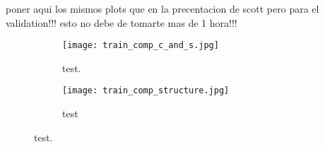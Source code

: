 
\glsresetall
\graphicspath{{./Sections/Results/Resources/}}

poner aqui los mismos plots que en la precentacion de scott pero para el validation!!! esto no debe de tomarte mas de 1 hora!!!

\begin{figure}[!ht]
  \centering
  \begin{subfigure}[b]{.9\linewidth}
    \texttt{[image: train\_comp\_c\_and\_s.jpg]}
    \caption{test.}
    \label{fig:results:lm_performance:test}
  \end{subfigure}%
  \vspace{3mm}
  \begin{subfigure}[b]{.9\linewidth}
    \texttt{[image: train\_comp\_structure.jpg]}
    \caption{test}
    \label{fig:results:lm_performance:test2}
  \end{subfigure}
  \caption{test.}
  \label{fig:results:lm_performance}
\end{figure}
